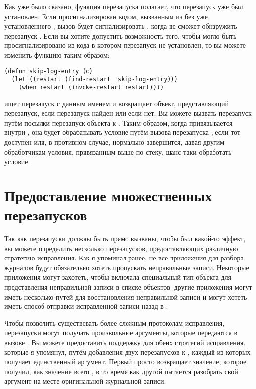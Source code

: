 Как уже было сказано, функция перезапуска  полагает, что перезапуск
 уже был установлен. Если 
просигнализирован кодом, вызванным из  без уже установленного
, вызов  будет сигнализировать
, когда не сможет обнаружить перезапуск . Если вы
хотите допустить возможность того, чтобы  могло быть
просигнализировано из кода в котором перезапуск  не установлен, то вы
можете изменить функцию  таким образом:

\begin{lstlisting}
(defun skip-log-entry (c)
  (let ((restart (find-restart 'skip-log-entry)))
    (when restart (invoke-restart restart))))
\end{lstlisting}

 ищет перезапуск с данным именем и возвращает объект, представляющий
перезапуск, если перезапуск найден или  если нет. Вы можете вызвать перезапуск
путём посылки перезапуск-объекта к . Таким образом, когда
 привязывается внутри , она будет обрабатывать
условие путём вызова перезапуска , если тот доступен или, в противном
случае, нормально завершится, давая другим обработчикам условия, привязанным выше по
стеку, шанс таки обработать условие.

\section{Предоставление множественных перезапусков}

Так как перезапуски должны быть прямо вызваны, чтобы был какой-то эффект, вы можете
определить несколько перезапусков, предоставляющих различную стратегию исправления. Как я
упоминал ранее, не все приложения для разбора журналов будут обязательно хотеть пропускать
неправильные записи. Некоторые приложения могут захотеть, чтобы 
включала специальный тип объекта для представления неправильной записи в списке
 объектов; другие приложения могут иметь несколько путей для
восстановления неправильной записи и могут хотеть иметь способ отправки исправленной
записи назад в .

Чтобы позволить существовать более сложным протоколам исправления, перезапуски могут
получать произвольные аргументы, которые передаются в вызове . Вы
можете предоставить поддержку для обеих стратегий исправления, которые я упомянул, путём
добавления двух перезапусков к , каждый из которых получает
единственный аргумент. Первый просто возвращает значение, которое получил, как значение
всего , в то время как другой пытается разобрать свой аргумент на
месте оригинальной журнальной записи.

